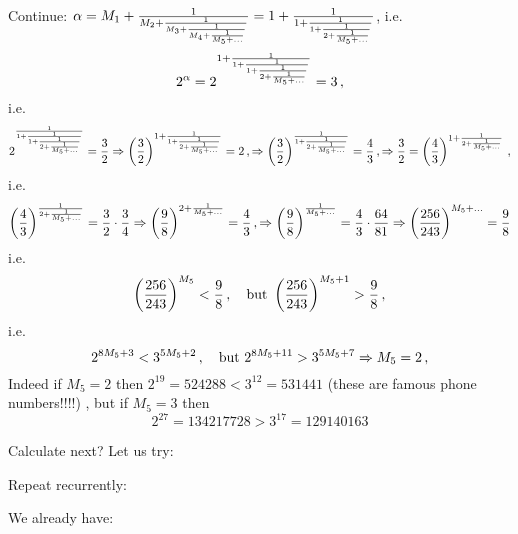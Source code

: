   Continue:
 $\alpha=M_1+{1\over M_2+{1\over M_3+{1\over M_4+{1\over M_5+\dots}}}}=
       1+{1\over 1+{1\over 1+{1\over 2+{1\over M_5+\dots}}}} $, 
i.e.
        $$
    2^\alpha=2^{1+{1\over 1+{1\over 1+{1\over 2+{1\over M_5+\dots}}}}}=3\,,
        $$
i.e.
          $$
    2^{{1\over 1+{1\over 1+{1\over 2+{1\over M_5+\dots}}}}}={3\over 2}
            \Rightarrow
      \left(3\over 2\right)^{1+{1\over 1+{1\over 2+{1\over M_5+\dots}}}}=2\,,
            \Rightarrow
      \left(3\over 2\right)^{{1\over 1+{1\over 2+{1\over M_5+\dots}}}}
           ={4\over 3}\,,
            \Rightarrow
      {3\over 2}=\left(4\over 3\right)^
        {1+{1\over 2+{1\over M_5+\dots}}}\,,
          $$
i.e.
           $$
    \left(4\over 3\right)^{1\over 2+{1\over M_5+\dots}}=
         {3\over 2}\cdot {3\over 4}
          \Rightarrow
         \left(9\over 8\right)^{2+{1\over M_5+\dots}}={4\over 3}\,,
          \Rightarrow
         \left(9\over 8\right)^{{1\over M_5+\dots}}={4\over 3}\cdot 
           {64\over 81}
          \Rightarrow
         \left(256\over 243\right)^{M_5+\dots}={9\over 8}
           $$
i.e.
        $$
      \left({256\over 243}\right)^{M_5}<{9\over 8}\,,
     \quad {\rm but}\,\,
      \left({256\over 243}\right)^{M_5+1}>{9\over 8}\,,
        $$
i.e.
        $$
    2^{8M_5+3}<3^{5M_5+2}\,,
   \quad {\rm but}\,\,
    2^{8M_5+11}>3^{5M_5+7}\Rightarrow M_5=2\,,
         $$
Indeed if $M_5=2$ then $2^{19}=524288<3^{12}=531441$
(these are famous phone numbers!!!!)
, but
if  $M_5=3$ then 
            $$
   2^{27}=134217728>3^{17}=129140163
            $$

Calculate next?  Let us try:

Repeat recurrently:

We already have:

